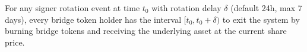 \begin{property}
\label{prop:exit}
For any signer rotation event at time $t_0$ with rotation delay $\delta$ (default 24h, max 7 days), every bridge token holder has the interval $[t_0, t_0 + \delta)$ to exit the system by burning bridge tokens and receiving the underlying asset at the current share price.
\end{property}

